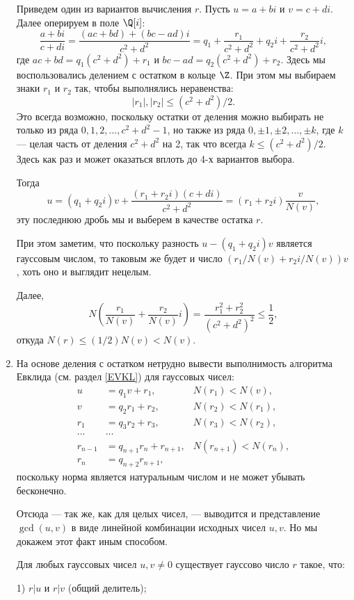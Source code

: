 \begin{enumerate}
Приведем один из вариантов вычисления $r$. Пусть $u=a+bi$ и $v=c+di$. Далее оперируем в поле $\Q[i]$:
$$
\frac{a+bi}{c+di}=\frac{(ac+bd)+(bc-ad)i}{c^2+d^2}=q_1+\frac{r_1}{c^2+d^2}+q_2i+\frac{r_2}{c^2+d^2}i,
$$
где $ac+bd=q_1(c^2+d^2)+r_1$ и $bc-ad=q_2(c^2+d^2)+r_2$. Здесь мы воспользовались делением с остатком в кольце $\Z$. При этом мы выбираем знаки $r_1$ и $r_2$ так, чтобы выполнялись неравенства:
$$
|r_1|,|r_2|\le (c^2+d^2)/2.
$$
Это всегда возможно, поскольку остатки от деления можно выбирать не только из ряда $0,1,2,\dots,c^2+d^2-1$, но также из ряда
$0,\pm 1,\pm 2,\dots,\pm k$, где $k$ --- целая часть от деления $c^2+d^2$ на 2, так что всегда $k\le(c^2+d^2)/2$. Здесь как раз и может оказаться вплоть до 4-х вариантов выбора.

Тогда
$$
u=(q_1+q_2i)v+\frac{(r_1+r_2i)(c+di)}{c^2+d^2}=(r_1+r_2i)\frac{v}{N(v)},
$$
эту последнюю дробь мы и выберем в качестве остатка $r$.

При этом заметим, что поскольку разность $u-(q_1+q_2i)v$ является гауссовым числом, то таковым же будет и число $(r_1/N(v)+r_2i/N(v))v$, хоть оно и выглядит нецелым.

Далее,
$$
N\left(\frac{r_1}{N(v)}+\frac{r_2}{N(v)}i\right)=\frac{r_1^2+r_2^2}{(c^2+d^2)^2}\le \frac 12,
$$
откуда $N(r)\le (1/2)N(v)<N(v)$.

\item На основе деления с остатком нетрудно вывести выполнимость алгоритма Евклида (см. раздел \ref{EVKL}) для гауссовых чисел:
\begin{align}
u & = q_1v + r_1, &  N(r_1)<N(v),\nonumber\\
v & = q_2r_1 + r_2, &  N(r_2)<N(r_1),\nonumber\\
r_1 & = q_3r_2 + r_3, &  N(r_3)<N(r_2),\label{alg-evlkid}\\
\dots & \dots & \nonumber\\
r_{n-1} & = q_{n+1}r_n + r_{n+1}, &  N(r_{n+1})<N(r_n),\nonumber\\
r_{n} & = q_{n+2}r_{n+1}, & \nonumber
\end{align}
поскольку норма является натуральным числом и не может убывать бесконечно.

Отсюда --- так же, как для целых чисел, --- выводится и представление $\gcd(u,v)$ в виде линейной комбинации исходных чисел $u,v$. Но мы докажем этот факт иным способом.
\begin{lem}\label{NOD}
Для любых гауссовых чисел $u,v\ne 0$ существует гауссово число $r$ такое, что:

\textup{1)} $r|u$ и $r|v$ (общий делитель);


\end{lem}
\end{enumerate}
